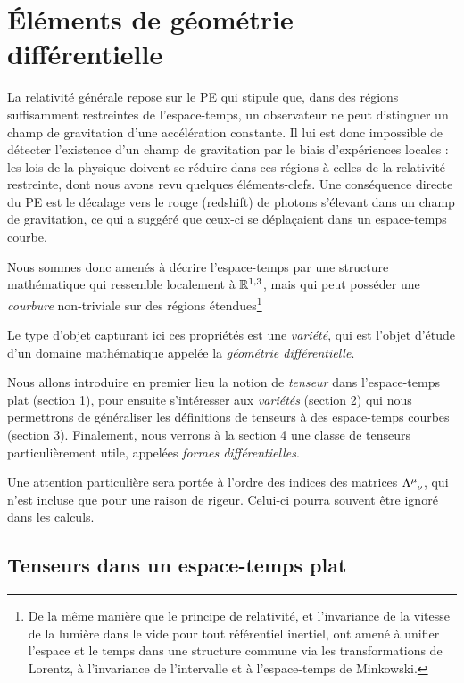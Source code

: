 {
\renewcommand\indexmarker{\cdot}

\chapter{Éléments de géométrie différentielle}
La relativité générale repose sur le PE qui stipule que, dans des régions suffisamment restreintes de l'espace-temps, un observateur ne peut distinguer un champ de gravitation d'une accélération constante. Il lui est donc impossible de détecter l'existence d'un champ de gravitation par le biais d'expériences locales : les lois de la physique doivent se réduire dans ces régions à celles de la relativité restreinte, dont nous avons revu quelques éléments-clefs. Une conséquence directe du PE est le décalage vers le rouge (redshift) de photons s'élevant dans un champ de gravitation, ce qui a suggéré que ceux-ci se déplaçaient dans un espace-temps courbe.

Nous sommes donc amenés à décrire l'espace-temps par une structure mathématique qui ressemble localement à $\mathbb{R}^{1,3}$, mais qui peut posséder une \emph{courbure} non-triviale sur des régions étendues\footnote{De la même manière que le principe de relativité, et l'invariance de la vitesse de la lumière dans le vide pour tout référentiel inertiel, ont amené à unifier l'espace et le temps dans une structure commune via les transformations de Lorentz, à l'invariance de l'intervalle et à l'espace-temps de Minkowski.}

Le type d'objet capturant ici ces propriétés est une \emph{variété}, qui est l'objet d'étude d'un domaine mathématique appelée la \emph{géométrie différentielle}. 

Nous allons introduire en premier lieu la notion de \emph{tenseur} dans l'espace-temps plat (section 1), pour ensuite s'intéresser aux \emph{variétés} (section 2) qui nous permettrons de généraliser les définitions de tenseurs à des espace-temps courbes (section 3). Finalement, nous verrons à la section 4 une classe de tenseurs particulièrement utile, appelées \emph{formes différentielles}.

Une attention particulière sera portée à l'ordre des indices des matrices $\Lambda\indices{^\mu_\nu}$, qui n'est incluse que pour une raison de rigeur. Celui-ci pourra souvent être ignoré dans les calculs.
\section{Tenseurs dans un espace-temps plat}

}
